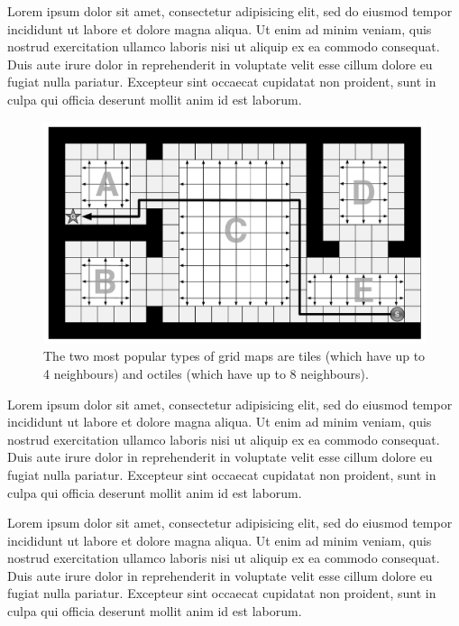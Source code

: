 Lorem ipsum dolor sit amet, consectetur adipisicing elit, sed do
eiusmod tempor incididunt ut labore et dolore magna aliqua. Ut enim
ad minim veniam, quis nostrud exercitation ullamco laboris nisi ut
aliquip ex ea commodo consequat. Duis aute irure dolor in
reprehenderit in voluptate velit esse cillum dolore eu fugiat nulla
pariatur. Excepteur sint occaecat cupidatat non proident, sunt in
culpa qui officia deserunt mollit anim id est laborum.

 \begin{figure}
	\centering
		\includegraphics[width=0.98\columnwidth]{diagrams/toymap_pruned.pdf}
	\caption{The two most popular types of grid maps are tiles (which have
up to 4 neighbours) and octiles (which have up to 8 neighbours).}
\vspace{1em}
 \end{figure}

Lorem ipsum dolor sit amet, consectetur adipisicing elit, sed do
eiusmod tempor incididunt ut labore et dolore magna aliqua. Ut enim
ad minim veniam, quis nostrud exercitation ullamco laboris nisi ut
aliquip ex ea commodo consequat. Duis aute irure dolor in
reprehenderit in voluptate velit esse cillum dolore eu fugiat nulla
pariatur. Excepteur sint occaecat cupidatat non proident, sunt in
culpa qui officia deserunt mollit anim id est laborum.

Lorem ipsum dolor sit amet, consectetur adipisicing elit, sed do
eiusmod tempor incididunt ut labore et dolore magna aliqua. Ut enim
ad minim veniam, quis nostrud exercitation ullamco laboris nisi ut
aliquip ex ea commodo consequat. Duis aute irure dolor in
reprehenderit in voluptate velit esse cillum dolore eu fugiat nulla
pariatur. Excepteur sint occaecat cupidatat non proident, sunt in
culpa qui officia deserunt mollit anim id est laborum.

